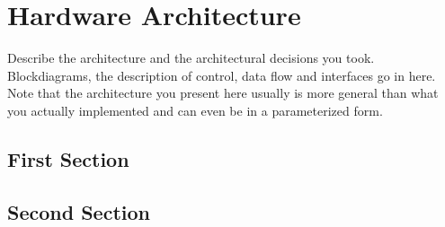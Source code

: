 
\chapter{Hardware Architecture}
Describe the architecture and the architectural decisions you
took. Blockdiagrams, the description of control, data flow and
interfaces go in here. Note that the architecture you present here
usually is more general than what you actually implemented and can
even be in a parameterized form.

\section{First Section}


\section{Second Section}
